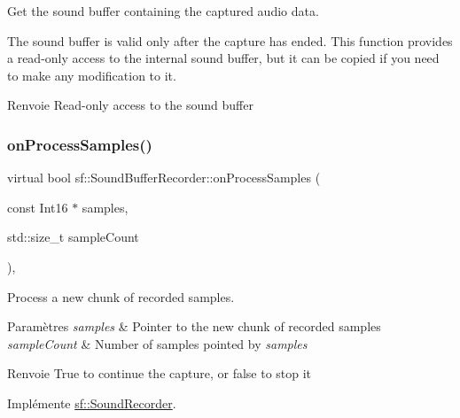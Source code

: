Get the sound buffer containing the captured audio data. 

The sound buffer is valid only after the capture has ended. This function provides a read-\/only access to the internal sound buffer, but it can be copied if you need to make any modification to it.

\begin{DoxyReturn}{Renvoie}
Read-\/only access to the sound buffer 
\end{DoxyReturn}
\mbox{\label{classsf_1_1SoundBufferRecorder_a9ceb94de14632ae8c1b78faf603b4767}} 
\subsubsection{\texorpdfstring{on\+Process\+Samples()}{onProcessSamples()}}
{\footnotesize\ttfamily virtual bool sf\+::\+Sound\+Buffer\+Recorder\+::on\+Process\+Samples (\begin{DoxyParamCaption}\item[{const Int16 $\ast$}]{samples,  }\item[{std\+::size\+\_\+t}]{sample\+Count }\end{DoxyParamCaption})\hspace{0.3cm}{\ttfamily [protected]}, {\ttfamily [virtual]}}



Process a new chunk of recorded samples. 


\begin{DoxyParams}{Paramètres}
{\em samples} & Pointer to the new chunk of recorded samples \\
\hline
{\em sample\+Count} & Number of samples pointed by {\itshape samples} \\
\hline
\end{DoxyParams}
\begin{DoxyReturn}{Renvoie}
True to continue the capture, or false to stop it 
\end{DoxyReturn}


Implémente \hyperlink{classsf_1_1SoundRecorder_a2670124cbe7a87c7e46b4840807f4fd7}{sf\+::\+Sound\+Recorder}.

\mbox{\label{classsf_1_1SoundBufferRecorder_a531a7445fc8a48eaf9fc039c83f17c6f}} 
